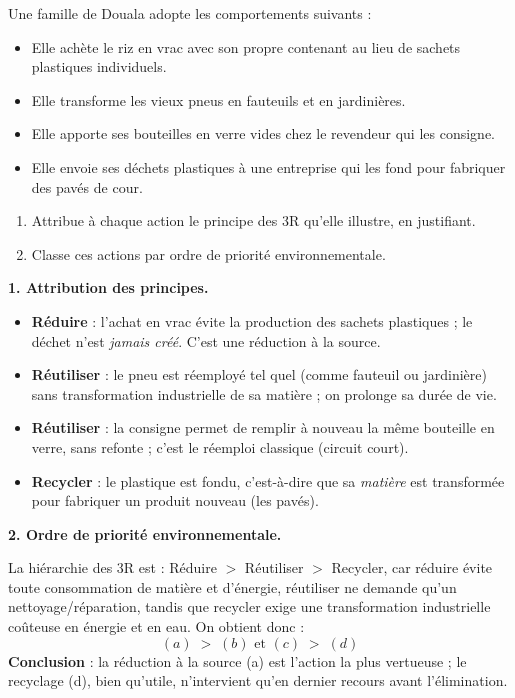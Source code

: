 \documentclass[11pt]{article}
\begin{document}
\begin{exoresolu}
Une famille de Douala adopte les comportements suivants :
\begin{itemize}
\item[(a)] Elle achète le riz en vrac avec son propre contenant au lieu de sachets plastiques individuels.
\item[(b)] Elle transforme les vieux pneus en fauteuils et en jardinières.
\item[(c)] Elle apporte ses bouteilles en verre vides chez le revendeur qui les consigne.
\item[(d)] Elle envoie ses déchets plastiques à une entreprise qui les fond pour fabriquer des pavés de cour.
\end{itemize}
\begin{enumerate}
\item Attribue à chaque action le principe des 3R qu'elle illustre, en justifiant.
\item Classe ces actions par ordre de priorité environnementale.
\end{enumerate}
\tcblower
\textbf{1. Attribution des principes.}
\begin{itemize}
\item[(a)] \textbf{Réduire} : l'achat en vrac évite la production des sachets plastiques ; le déchet n'est \emph{jamais créé}. C'est une réduction à la source.
\item[(b)] \textbf{Réutiliser} : le pneu est réemployé tel quel (comme fauteuil ou jardinière) sans transformation industrielle de sa matière ; on prolonge sa durée de vie.
\item[(c)] \textbf{Réutiliser} : la consigne permet de remplir à nouveau la même bouteille en verre, sans refonte ; c'est le réemploi classique (circuit court).
\item[(d)] \textbf{Recycler} : le plastique est fondu, c'est-à-dire que sa \emph{matière} est transformée pour fabriquer un produit nouveau (les pavés).
\end{itemize}
\textbf{2. Ordre de priorité environnementale.}

La hiérarchie des 3R est : Réduire $>$ Réutiliser $>$ Recycler, car réduire évite toute consommation de matière et d'énergie, réutiliser ne demande qu'un nettoyage/réparation, tandis que recycler exige une transformation industrielle coûteuse en énergie et en eau. On obtient donc :
\[ (a) \;>\; (b) \text{ et } (c) \;>\; (d) \]
\textbf{Conclusion} : la réduction à la source (a) est l'action la plus vertueuse ; le recyclage (d), bien qu'utile, n'intervient qu'en dernier recours avant l'élimination.
\end{exoresolu}
\end{document}
